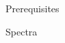 \documentclass[12pt]{amsart}
\newcommand{\R}{{\mathbb R}}
\theoremstyle{plain}
\theoremstyle{definition}
\newtheorem{defin}[thm]{Definition}
\theoremstyle{remark}
\begin{document}
\begin{section}{Prerequisites}
\begin{subsection}{Spectra}


\end{subsection}
\end{section}
\end{document}
